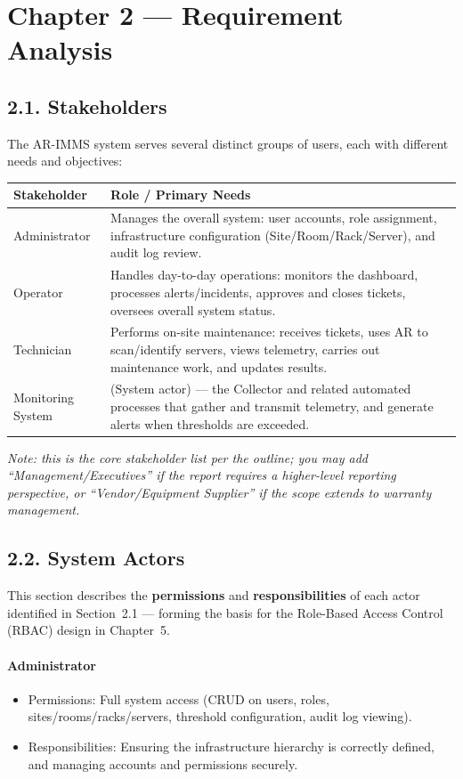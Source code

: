 \documentclass[12pt]{article}
\begin{document}
\section*{Chapter 2 --- Requirement Analysis}

\subsection*{2.1. Stakeholders}

The AR-IMMS system serves several distinct groups of users, each with different needs and objectives:

\begin{longtable}{L{3.2cm} L{10.5cm}}
\toprule
\textbf{Stakeholder} & \textbf{Role / Primary Needs} \\
\midrule
\endhead
Administrator & Manages the overall system: user accounts, role assignment, infrastructure configuration (Site/Room/Rack/Server), and audit log review. \\[4pt]
Operator & Handles day-to-day operations: monitors the dashboard, processes alerts/incidents, approves and closes tickets, oversees overall system status. \\[4pt]
Technician & Performs on-site maintenance: receives tickets, uses AR to scan/identify servers, views telemetry, carries out maintenance work, and updates results. \\[4pt]
Monitoring System & (System actor) --- the Collector and related automated processes that gather and transmit telemetry, and generate alerts when thresholds are exceeded. \\
\bottomrule
\end{longtable}

\textit{Note: this is the core stakeholder list per the outline; you may add ``Management/Executives'' if the report requires a higher-level reporting perspective, or ``Vendor/Equipment Supplier'' if the scope extends to warranty management.}

\subsection*{2.2. System Actors}

This section describes the \textbf{permissions} and \textbf{responsibilities} of each actor identified in Section~2.1 --- forming the basis for the Role-Based Access Control (RBAC) design in Chapter~5.

\paragraph{Administrator}
\begin{itemize}[leftmargin=*]
    \item Permissions: Full system access (CRUD on users, roles, sites/rooms/racks/servers, threshold configuration, audit log viewing).
    \item Responsibilities: Ensuring the infrastructure hierarchy is correctly defined, and managing accounts and permissions securely.
\end{itemize}
\end{document}
